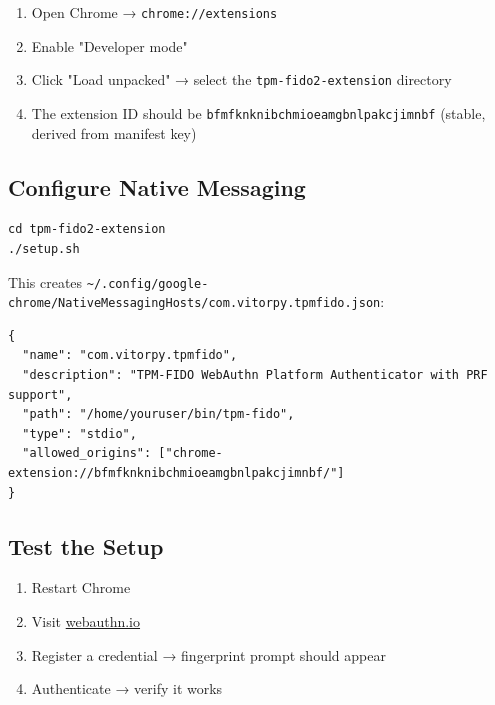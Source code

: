 \documentclass{article}
\begin{document}
\begin{enumerate}
\item Open Chrome → \texttt{chrome://extensions}

\item Enable "Developer mode"

\item Click "Load unpacked" → select the \texttt{tpm-fido2-extension} directory

\item The extension ID should be \texttt{bfmfknknibchmioeamgbnlpakcjimnbf} (stable, derived from manifest key)

\end{enumerate}

\subsection{Configure Native Messaging}

\begin{verbatim}
cd tpm-fido2-extension
./setup.sh
\end{verbatim}

This creates \texttt{\textasciitilde{}/.config/google-chrome/NativeMessagingHosts/com.vitorpy.tpmfido.json}:

\begin{verbatim}
{
  "name": "com.vitorpy.tpmfido",
  "description": "TPM-FIDO WebAuthn Platform Authenticator with PRF support",
  "path": "/home/youruser/bin/tpm-fido",
  "type": "stdio",
  "allowed_origins": ["chrome-extension://bfmfknknibchmioeamgbnlpakcjimnbf/"]
}
\end{verbatim}

\subsection{Test the Setup}

\begin{enumerate}
\item Restart Chrome

\item Visit \href{https://webauthn.io}{webauthn.io}

\item Register a credential → fingerprint prompt should appear

\item Authenticate → verify it works

\end{enumerate}
\end{document}
